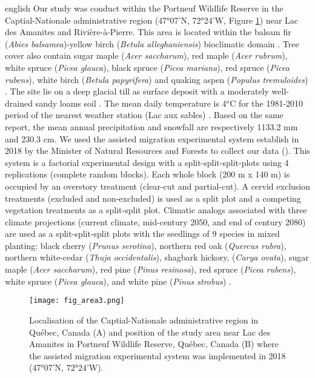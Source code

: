 \begin{otherlanguage*}{english}
  Our study was conduct within the Portneuf Wildlife Reserve in the Captial-Nationale administrative region (47°07'N, 72°24'W, Figure \ref{fig:area}) near Lac des Amanites and Rivière-à-Pierre. 
  This area is located within the balsam fir (\textit{Abies balsamea})-yellow birch (\textit{Betula alleghaniensis}) bioclimatic domain \citep{saucierChapitreEcologieForestiere2009}.
  Tree cover also contain sugar maple (\textit{Acer saccharum}), red maple (\textit{Acer rubrum}), white spruce (\textit{Picea glauca}), black spruce (\textit{Picea mariana}), red spruce (\textit{Picea rubens}), white birch (\textit{Betula papyrifera}) and quaking aspen (\textit{Populus tremuloides}) \citep{olaBelowgroundCarbonStocks2024}. 
  The site lie on a deep glacial till as surface deposit with a moderately well-drained sandy loams soil \citep{CanadianSystemSoil1998}.
  The mean daily temperature is 4$^{o}$C for the 1981-2010 period of the nearest weather station (Lac aux sables) \citep{environmentcanadaCanadianClimateNormals2019}. 
  Based on the same report, the mean annual precipitation and snowfall are respectively 1133.2 mm and 230.3 cm.
  We used the assisted migration experimental system establish in 2018 by the Minister of Natural Resources and Forests to collect our data (\citealp{royoDesiredREgenerationAssisted2023}).
  This system is a factorial experimental design with a split-split-split-plots using 4 replications (complete random blocks). 
  Each whole block (200 m x 140 m) is occupied by an overstory treatment (clear-cut and partial-cut). 
  A cervid exclusion treatments (excluded and non-excluded) is used as a split plot and a competing vegetation treatments as a split-split plot. 
  Climatic analogs associated with three climate projections (current climate, mid-century 2050, and end of century 2080) 
  are used as a split-split-split plots with the seedlings of 9 species in mixed planting: black cherry (\textit{Prunus serotina}), northern red oak (\textit{Quercus rubra}), 
  northern white-cedar (\textit{Thuja occidentalis}), shagbark hickory, (\textit{Carya ovata}), sugar maple (\textit{Acer saccharum}), red pine (\textit{Pinus resinosa}), 
  red spruce (\textit{Picea rubens}), white spruce (\textit{Picea glauca}), and white pine (\textit{Pinus strobus}) \citep{royoDesiredREgenerationAssisted2023}.

\end{otherlanguage*}

\begin{figure}[ht!]
	\centering
	\texttt{[image: fig\_area3.png]}
	\caption[Localisation of the Captial-Nationale administrative region in Québec, Canada and position of the study area near Lac des Amanites in Portneuf Wildlife Reserve, Québec, Canada.]
  {Localisation of the Captial-Nationale administrative region in Québec, Canada (A) and position of the study area near Lac des Amanites in Portneuf Wildlife Reserve, Québec, Canada (B) where the assisted migration experimental system was implemented in 2018 (47°07'N, 72°24'W).}
	\label{fig:area}
	\end{figure}  




